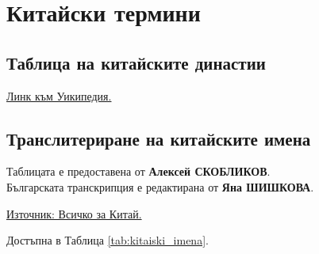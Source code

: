 \chapter{Китайски термини}
\section{Таблица на китайските династии}
\href{https://bg.wikipedia.org/wiki/%D0%9A%D0%B8%D1%82%D0%B0%D0%B9%D1%81%D0%BA%D0%B8_%D0%B4%D0%B8%D0%BD%D0%B0%D1%81%D1%82%D0%B8%D0%B8}{Линк към Уикипедия.} 

\section{Транслитериране на китайските имена}

Таблицата е предоставена от \textbf{Алексей СКОБЛИКОВ}. \\
Българската транскрипция е редактирана от \textbf{Яна ШИШКОВА}.

\href{http://china.edax.org/?p=326}{Източник: Всичко за Китай.}

Достъпна в Таблица \ref{tab:kitaiski_imena}.